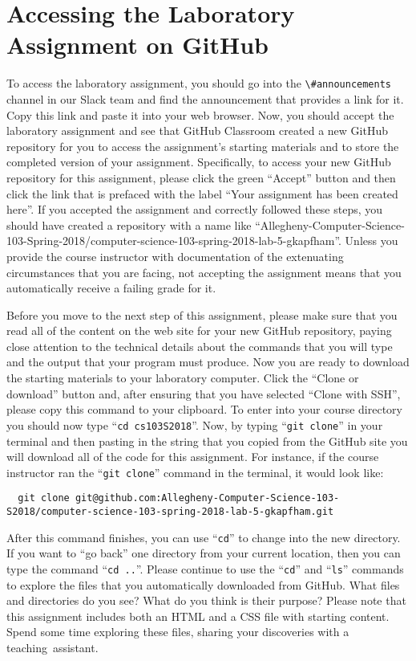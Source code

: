 \documentclass[11pt]{article}
\newcommand{\command}[1]{``\lstinline{#1}''}
\newcommand{\channel}[1]{\lstinline{#1}}
\newcommand{\step}[1]{``{#1}''}
\begin{document}
\section*{Accessing the Laboratory Assignment on GitHub}

To access the laboratory assignment, you should go into the
\channel{\#announcements} channel in our Slack team and find the announcement
that provides a link for it. Copy this link and paste it into your web browser.
Now, you should accept the laboratory assignment and see that GitHub Classroom
created a new GitHub repository for you to access the assignment's starting
materials and to store the completed version of your assignment. Specifically,
to access your new GitHub repository for this assignment, please click the green
``Accept'' button and then click the link that is prefaced with the label ``Your
assignment has been created here''. If you accepted the assignment and correctly
followed these steps, you should have created a repository with a name like
``Allegheny-Computer-Science-103-Spring-2018/computer-science-103-spring-2018-lab-5-gkapfham''.
Unless you provide the course instructor with documentation of the extenuating
circumstances that you are facing, not accepting the assignment means that you
automatically receive a failing grade for it.

Before you move to the next step of this assignment, please make sure that you
read all of the content on the web site for your new GitHub repository, paying
close attention to the technical details about the commands that you will type
and the output that your program must produce. Now you are ready to download the
starting materials to your laboratory computer. Click the ``Clone or download''
button and, after ensuring that you have selected ``Clone with SSH'', please
copy this command to your clipboard. To enter into your course directory you
should now type \command{cd cs103S2018}. Now, by typing \command{git clone} in
your terminal and then pasting in the string that you copied from the GitHub
site you will download all of the code for this assignment. For instance, if the
course instructor ran the \command{git clone} command in the terminal, it would
look like:

\begin{lstlisting}
  git clone git@github.com:Allegheny-Computer-Science-103-S2018/computer-science-103-spring-2018-lab-5-gkapfham.git
\end{lstlisting}

After this command finishes, you can use \command{cd} to change into the new
directory. If you want to \step{go back} one directory from your current
location, then you can type the command \command{cd ..}. Please continue to use
the \command{cd} and \command{ls} commands to explore the files that you
automatically downloaded from GitHub. What files and directories do you see?
What do you think is their purpose? Please note that this assignment includes
both an HTML and a CSS file with starting content. Spend some time exploring
these files, sharing your discoveries with a \mbox{teaching assistant}.
\end{document}
